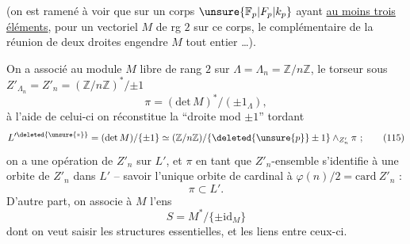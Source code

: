 (on est ramené à voir que sur un corps $\unsure{\mathbb F_p|F_p|k_p}$ ayant \uline{au moins trois éléments}, pour un vectoriel $M$ de rg $2$ sur ce corps, le  complémentaire de la réunion de deux droites engendre $M$ tout entier \ldots).

On a associé au module $M$ libre de rang $2$ sur $\Lambda=\Lambda_n=\mathbb Z/n\mathbb Z$, le torseur sous $Z'_{\Lambda_n}=Z'_n=(\mathbb Z/n\mathbb Z)^*/{\pm1}$\deleted{\unsure{,}}
\[
\pi=(\mathrm{det}\,M)^*/(\pm1_\Lambda),\tag*{(114)}
\]
à l'aide de celui-ci on réconstitue la ``droite mod $\pm1$''  tordant
\[
L^{\prime\deleted{\unsure{*}}}=(\mathrm{det}\,M)/\{\pm1\}\simeq(\mathbb Z/n\mathbb Z)/\{\deleted{\unsure{p}}\pm1\}\mathbin{\wedge}_{Z'_n}\pi\ ;\tag*{(115)}
\]
on a une opération de $Z'_n$ sur $L'$, et $\pi$ en tant que $Z'_n$-ensemble s'identifie à une  orbite de $Z'_n$ dans $L'$ -- savoir  l'unique orbite de cardinal  à $\varphi(n)/2=\mathrm{card}\ Z'_n$ :
\[
\pi\subset L'.\tag*{(116)}
\]
D'autre part, on associe à $M$ l'ens
\[
S=M^*/\{\pm\mathrm{id}_M\}\tag*{(117)}
\]
dont on veut saisir les structures essentielles, et les liens entre ceux-ci.
